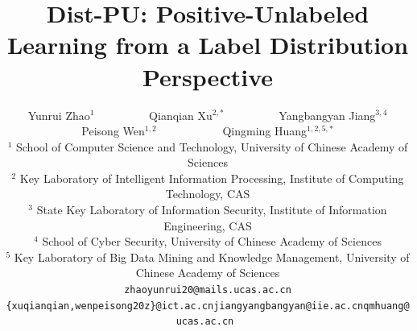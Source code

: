 \documentclass[final]{cvpr}
\begin{document}
\title{Dist-PU: Positive-Unlabeled Learning from a Label Distribution Perspective}

\author{
\parbox{16cm}
  {\centering
    {\large Yunrui Zhao$^{1}$ \ \ \ \ \ \ \ \ \  Qianqian Xu$^{2,*}$ \ \ \ \ \ \ \ \ \  Yangbangyan Jiang$^{3,4}$ \\
    Peisong Wen$^{1,2}$ \ \ \ \ \ \ \ \ \ \ \  Qingming Huang$^{1,2,5,*}$ }\\
    {\normalsize
    $^1$ School of Computer Science and Technology, University of Chinese Academy of Sciences \\
    $^2$ Key Laboratory of Intelligent Information Processing, Institute of Computing Technology, CAS\\
    $^3$ State Key Laboratory of Information Security, Institute of Information Engineering, CAS\\
    $^4$ School of Cyber Security, University of Chinese Academy of Sciences\\
    $^5$ Key Laboratory of Big Data Mining and Knowledge Management, University of Chinese Academy of Sciences\\
    }
    {\tt\small zhaoyunrui20@mails.ucas.ac.cn \quad\quad \{xuqianqian,wenpeisong20z\}@ict.ac.cn\quad\quad jiangyangbangyan@iie.ac.cn\quad\quad qmhuang@ucas.ac.cn  
    }
  }
}

\maketitle
\end{document}
